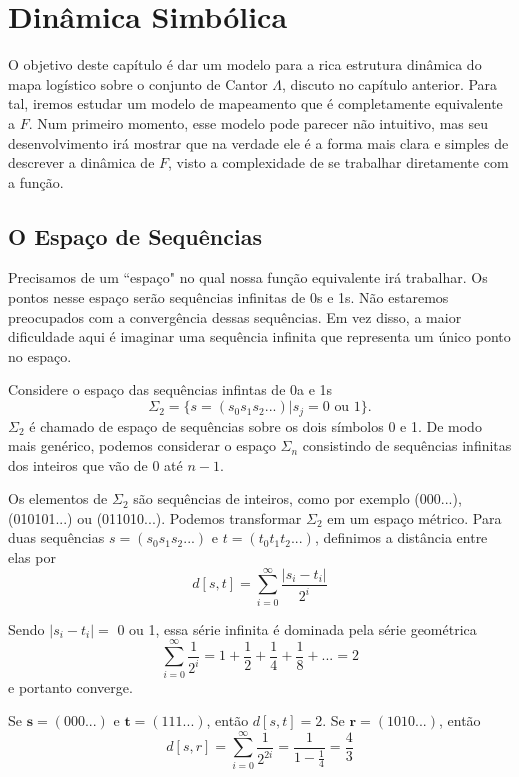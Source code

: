 \documentclass[../IC.tex]{subfiles}
\begin{document}
	\chapter {Dinâmica Simbólica}
	
	O objetivo deste capítulo é dar um modelo para a rica estrutura dinâmica do mapa logístico sobre o conjunto de Cantor $\Lambda$, discuto no capítulo anterior. Para tal, iremos estudar um modelo de mapeamento que é completamente equivalente a $F$. Num primeiro momento, esse modelo pode parecer não intuitivo, mas seu desenvolvimento irá mostrar que na verdade ele é a forma mais clara e simples de descrever a dinâmica de $F$, visto a complexidade de se trabalhar diretamente com a função.
	
	\section{O Espaço de Sequências}
	
	Precisamos de um ``espaço" no qual nossa função equivalente irá trabalhar. Os pontos nesse espaço serão sequências infinitas de 0s e 1s. Não estaremos preocupados com a convergência dessas sequências. Em vez disso, a maior dificuldade aqui é imaginar uma sequência infinita que representa um único ponto no espaço.
	
	Considere o espaço das sequências infintas de 0a e 1s
		$$\Sigma_2 = \{s=(s_0s_1s_2...)|s_j=0 \text{ ou } 1\}.$$
	$\Sigma_2$ é chamado de espaço de sequências sobre os dois símbolos 0 e 1. De modo mais genérico, podemos considerar o espaço $\Sigma_n$ consistindo de sequências infinitas dos inteiros que vão de 0 até $n-1$.
	
	Os elementos de $\Sigma_2$ são sequências de inteiros, como por exemplo (000...), (010101...) ou (011010...). Podemos transformar $\Sigma_2$ em um espaço métrico. Para duas sequências $s=(s_0s_1s_2...)$ e $t=(t_0t_1t_2...)$, definimos a distância entre elas por
	$$d[s, t] = \sum_{i=0}^{\infty} \dfrac{|s_i - t_i|}{2^i}$$
	
	Sendo $|s_i-t_i|=$ 0 ou 1, essa série infinita é dominada pela série geométrica 
	$$\sum_{i=0}^{\infty} \dfrac{1}{2^i} = 1 + \frac{1}{2} + \frac{1}{4} + \frac{1}{8} + ... = 2$$
	e portanto converge.
	
	\begin{exemplo}
		Se $\textbf{s}=(000...)$ e $\textbf{t}=(111...)$, então $d[s,t]=2$. Se $\textbf{r}=(1010...)$, então
		$$d[s, r] = \sum_{i=0}^{\infty} \dfrac{1}{2^{2i}}= \frac{1}{1-\frac{1}{4}} = \frac{4}{3}$$
	\end{exemplo}
	
\end{document}
